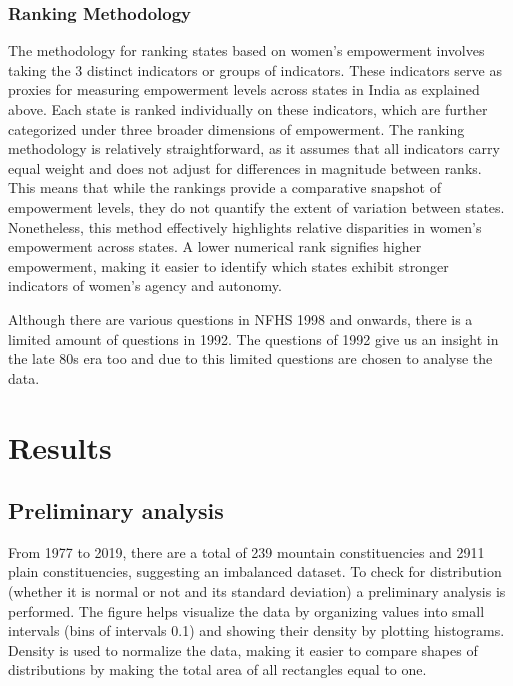\subsubsection{Ranking Methodology}
\label{ranking_methodology}
 The methodology for ranking states based on women's empowerment involves taking the 3 distinct indicators or groups of indicators. These indicators serve as proxies for measuring empowerment levels across states in India as explained above. Each state is ranked individually on these indicators, which are further categorized under three broader dimensions of empowerment. The ranking methodology is relatively straightforward, as it assumes that all indicators carry equal weight and does not adjust for differences in magnitude between ranks. This means that while the rankings provide a comparative snapshot of empowerment levels, they do not quantify the extent of variation between states. Nonetheless, this method effectively highlights relative disparities in women's empowerment across states. A lower numerical rank signifies higher empowerment, making it easier to identify which states exhibit stronger indicators of women's agency and autonomy.

\vspace{0.3cm}

Although there are various questions in NFHS 1998 and onwards, there is a limited amount of questions in 1992. The questions of 1992 give us an insight in the late 80s era too and due to this limited questions are chosen to analyse the data.


\section{Results}
\subsection{Preliminary analysis}

From 1977 to 2019, there are a total of 239 mountain constituencies and 2911 plain constituencies, suggesting an imbalanced dataset. To check for distribution (whether it is normal or not and its standard deviation) a preliminary analysis is performed. The figure helps visualize the data by organizing values into small intervals (bins of intervals 0.1) and showing their density by plotting histograms. Density is used to normalize the data, making it easier to compare shapes of distributions by making the total area of all rectangles equal to one.

